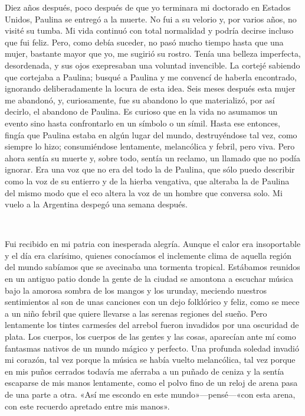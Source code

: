 \documentclass[a4paper, 12pt]{article}
\begin{document}
Diez años después, poco después de que yo terminara mi doctorado en Estados
Unidos, Paulina se entregó a la muerte. No fui a su velorio y, por varios años,
no visité su tumba. Mi vida continuó con total normalidad y podría decirse
incluso que fui feliz. Pero, como debía suceder, no pasó mucho tiempo hasta que
una mujer, bastante mayor que yo, me sugirió su rostro. Tenía una belleza
imperfecta, desordenada, y sus ojos exepresaban una voluntad invencible. La
cortejé sabiendo que cortejaba a Paulina; busqué a Paulina y me convencí de
haberla encontrado, ignorando deliberadamente la locura de esta idea. Seis meses
después esta mujer me abandonó, y, curiosamente, fue su abandono lo que
materializó, por así decirlo, el abandono de Paulina. Es curioso que en la vida
no asumamos un evento sino hasta confrontarlo en un símbolo o un símil. Hasta
ese entonces, fingía que Paulina estaba en algún lugar del mundo, destruyéndose
tal vez, como siempre lo hizo; consumiéndose lentamente, melancólica y febril,
pero viva. Pero ahora sentía su muerte y, sobre todo, sentía un reclamo, un
llamado que no podía ignorar. Era una voz que no era del todo la de Paulina,
que sólo puedo describir como la voz de su entierro y de la hierba vengativa,
que alteraba la de Paulina del mismo modo que el eco altera la voz de un hombre
que conversa solo. Mi vuelo a la Argentina despegó una semana después.

~

Fui recibido en mi patria con inesperada alegría. Aunque el calor era
insoportable y el día era clarísimo, quienes conocíamos el inclemente clima de
aquella región del mundo sabíamos que se avecinaba una tormenta tropical.
Estábamos reunidos en un antiguo patio donde la gente de la ciudad se amontona a
escuchar música bajo la amorosa sombra de los mangos y los urunday, meciendo
nuestros sentimientos al son de unas canciones con un dejo folklórico y feliz,
como se mece a un niño febril que quiere llevarse a las serenas regiones del
sueño. Pero lentamente los tintes carmesíes del arrebol fueron invadidos por una
oscuridad de plata. Los cuerpos, los cuerpos de las gentes y las cosas,
aparecían ante mí como fantasmas nativos de un mundo mágico y perfecto. Una
profunda soledad invadió mi corazón, tal vez porque la música se había vuelto
melancólica, tal vez porque en mis puños cerrados todavía me aferraba a un
puñado de ceniza y la sentía escaparse de mis manos lentamente, como el polvo
fino de un reloj de arena pasa de una parte a otra. «Así me escondo en este
mundo»—pensé—«con esta arena, con este recuerdo apretado entre mis manos».
\end{document}
